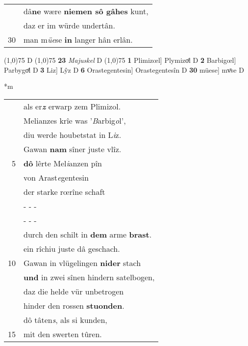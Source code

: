 \documentclass[8pt,a4paper,notitlepage]{article}
\begin{document}
\begin{table}[ht]
\begin{minipage}[t]{0.5\linewidth}
\begin{tabular}{rl}
 & dâ\textbf{ne} wære \textbf{niemen sô gâhes} kunt,\\ 
 & daz er im würde undertân.\\ 
30 & man m\textit{üe}se \textbf{in} langer hân erlân.\\ 
\end{tabular}
\scriptsize
\line(1,0){75} \newline
D \newline
\line(1,0){75} \newline
\textbf{23} \textit{Majuskel} D  \newline
\line(1,0){75} \newline
\textbf{1} Plimizœl] Plymizoͤl D \textbf{2} Barbigœl] Parbygoͤl D \textbf{3} Liz] Lŷz D \textbf{6} Orastegentesin] Orastegentesîn D \textbf{30} müese] mvͦse D \newline
\end{minipage}
\hspace{0.5cm}
\begin{minipage}[t]{0.5\linewidth}
\small
\begin{center}*m
\end{center}
\begin{tabular}{rl}
 & als er\textit{\textbf{z}} erwarp zem Plimizol.\\ 
 & Melianzes krîe was '\textit{B}arbig\textit{o}l',\\ 
 & diu werde houbetstat in L\textit{i}z.\\ 
 & Gawan \textbf{nam} sîner juste vlîz.\\ 
5 & \textbf{dô} lêrte Mel\textit{i}anzen pîn\\ 
 & von Arast\textit{e}gentesin\\ 
 & der starke rœrîne schaft\\ 
 & \multicolumn{1}{l}{ - - - }\\ 
 & \multicolumn{1}{l}{ - - - }\\ 
 & durch den schilt in \textbf{dem} arme \textbf{brast}.\\ 
 & ein rîchiu juste dâ geschach.\\ 
10 & Gawan in vlügelingen \textbf{nider} stach\\ 
 & \textbf{und} in zwei sînen hindern satelbogen,\\ 
 & daz die helde vür unbetrogen\\ 
 & hinder den rossen \textbf{stuonden}.\\ 
 & dô tâten\textit{s}, als si kunden,\\ 
15 & mit den swerten tûren.\\ 

\end{tabular}
\end{minipage}
\end{table}
\end{document}
